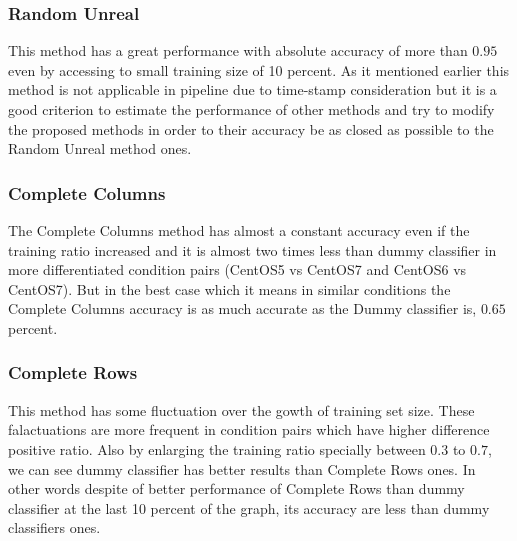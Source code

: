 \documentclass[10pt, conference, compsocconf]{IEEEtran}
\begin{document}
\subsubsection{Random Unreal}
This method has a great performance with absolute accuracy of more than $0.95$ 
even by accessing to small training size of 10 percent. As it mentioned earlier 
this method is not applicable in pipeline due to time-stamp consideration but it 
is a good criterion to estimate the performance of other methods and try to modify 
the proposed methods in order to their accuracy be as closed as possible to the 
Random Unreal method ones.  


\subsubsection{Complete Columns}
The Complete Columns method has almost a constant accuracy even if the training ratio increased and it
is almost two times less than dummy classifier in more differentiated
condition pairs (CentOS5 vs CentOS7 and CentOS6 vs CentOS7). But in the
best case which it means in similar conditions the Complete Columns
accuracy is as much accurate as the Dummy classifier is, $0.65$
percent.
\\
\subsubsection{Complete Rows}
This method has some fluctuation over the gowth of training set size. These falactuations are more 
frequent in condition pairs which have higher difference positive ratio. 
Also by enlarging the training ratio specially between $0.3$ to $0.7$, 
we can see dummy classifier has better results than Complete Rows ones. 
In other words despite of better performance of Complete Rows than 
dummy classifier at the last 10 percent of the graph, its accuracy 
are less than dummy classifiers ones.  
\\
\end{document}
